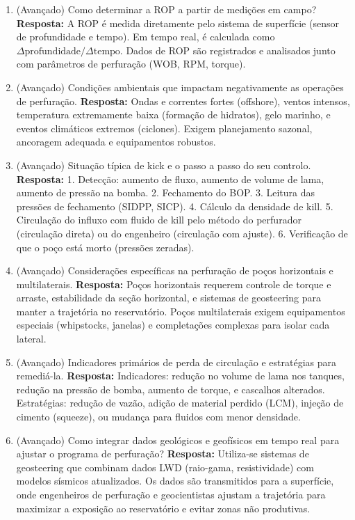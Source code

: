 \documentclass[11pt,a4paper]{article}
\begin{document}
\begin{enumerate}
  \item (Avançado) Como determinar a ROP a partir de medições em campo?
  \textbf{Resposta:} A ROP é medida diretamente pelo sistema de superfície (sensor de profundidade e tempo). Em tempo real, é calculada como $\Delta \text{profundidade} / \Delta \text{tempo}$. Dados de ROP são registrados e analisados junto com parâmetros de perfuração (WOB, RPM, torque).

  \item (Avançado) Condições ambientais que impactam negativamente as operações de perfuração.
  \textbf{Resposta:} Ondas e correntes fortes (offshore), ventos intensos, temperatura extremamente baixa (formação de hidratos), gelo marinho, e eventos climáticos extremos (ciclones). Exigem planejamento sazonal, ancoragem adequada e equipamentos robustos.

  \item (Avançado) Situação típica de kick e o passo a passo do seu controlo.
  \textbf{Resposta:} 1. Detecção: aumento de fluxo, aumento de volume de lama, aumento de pressão na bomba. 2. Fechamento do BOP. 3. Leitura das pressões de fechamento (SIDPP, SICP). 4. Cálculo da densidade de kill. 5. Circulação do influxo com fluido de kill pelo método do perfurador (circulação direta) ou do engenheiro (circulação com ajuste). 6. Verificação de que o poço está morto (pressões zeradas).

  \item (Avançado) Considerações específicas na perfuração de poços horizontais e multilaterais.
  \textbf{Resposta:} Poços horizontais requerem controle de torque e arraste, estabilidade da seção horizontal, e sistemas de geosteering para manter a trajetória no reservatório. Poços multilaterais exigem equipamentos especiais (whipstocks, janelas) e completações complexas para isolar cada lateral.

  \item (Avançado) Indicadores primários de perda de circulação e estratégias para remediá-la.
  \textbf{Resposta:} Indicadores: redução no volume de lama nos tanques, redução na pressão de bomba, aumento de torque, e cascalhos alterados. Estratégias: redução de vazão, adição de material perdido (LCM), injeção de cimento (squeeze), ou mudança para fluidos com menor densidade.

  \item (Avançado) Como integrar dados geológicos e geofísicos em tempo real para ajustar o programa de perfuração?
  \textbf{Resposta:} Utiliza-se sistemas de geosteering que combinam dados LWD (raio-gama, resistividade) com modelos sísmicos atualizados. Os dados são transmitidos para a superfície, onde engenheiros de perfuração e geocientistas ajustam a trajetória para maximizar a exposição ao reservatório e evitar zonas não produtivas.
\end{enumerate}
\end{document}
